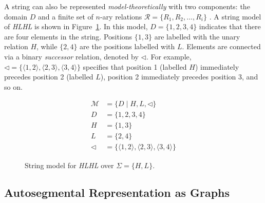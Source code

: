 \documentclass{CUP-JNL-PHO}%
\theoremstyle{definition}
\numberwithin{equation}{section}
\theoremstyle{definition}
\begin{document}
A string can also be represented \textit{model-theoretically} with two
components: the domain $D$ and a finite set of $n$-ary relations
$\mathcal{R} = \{ R_1, R_2, \ldots, R_i \}$ \citep{rogers2013,
	chandleeBufia2019, rogers.lambert2019mol}.  A string model of
\textit{HLHL} is shown in Figure~\ref{fig.model.str}.  In this
model, $D = \{1, 2, 3, 4\}$ indicates that there are four elements in
the string. Positions $\{1, 3\}$ are 
labelled with the unary relation $H$, while $\{2, 4\}$ are the
positions labelled with $L$.  Elements are connected via a
binary \textit{successor} relation, denoted by $\lhd$.  For example,
$\lhd = \{\langle 1, 2\rangle, \langle 2, 3\rangle, \langle 3,
4\rangle\}$ specifies that position 1 (labelled $H$) immediately
precedes position 2 (labelled $L$), position 2 immediately precedes
position 3, and so on.

\begin{figure}
	\centering	
	\begin{minipage}[r]{0.4\textwidth}
		\centering
	\end{minipage}
	\hfil
	\begin{minipage}[l]{0.40\textwidth}
		\small
		\[
		\begin{aligned}
			\mathcal{M} &= \{D \mid H,L,\lhd\} \\
			D           &= \{1,2,3,4\} \\
			H           &= \{1,3\} \\
			L           &= \{2,4\} \\
			\lhd        &= \{\langle1,2\rangle,\langle2,3\rangle,\langle3,4\rangle\}
		\end{aligned}
		\]
	\end{minipage}
	\caption{String model for \textit{HLHL} over $\Sigma=\{H,L\}$.}
	\label{fig.model.str}
\end{figure}

\subsection{Autosegmental Representation as Graphs}\label{sec:prelim.ar}
\end{document}
